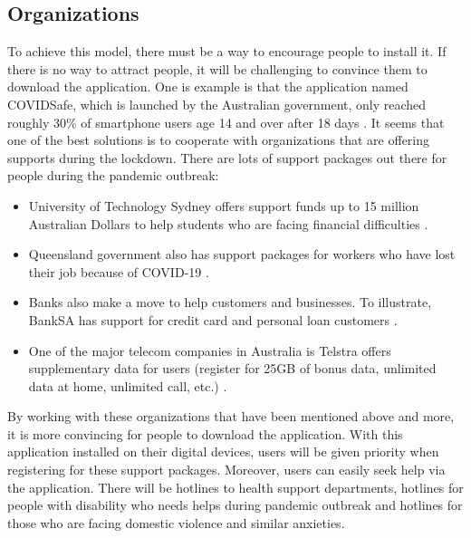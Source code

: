     \subsection{Organizations}
      \par To achieve this model, there must be a way to encourage people to install it. If there is no way to attract people, it will be challenging to convince them to download the application. One is example is that the application named COVIDSafe, which is launched by the Australian government, only reached roughly 30\% of smartphone users age 14 and over after 18 days \parencite{Stake13}. It seems that one of the best solutions is to cooperate with organizations that are offering supports during the lockdown. There are lots of support packages out there for people during the pandemic outbreak:
        \begin{itemize}
          \item University of Technology Sydney offers support funds up to 15 million Australian Dollars to help students who are facing financial difficulties \parencite{Stake14}.
          \item Queensland government also has support packages for workers who have lost their job because of COVID-19 \parencite{Stake15}.
          \item Banks also make a move to help customers and businesses. To illustrate, BankSA has support for credit card and personal loan customers \parencite{Stake16}.
          \item One of the major telecom companies in Australia is Telstra offers supplementary data for users (register for 25GB of bonus data, unlimited data at home, unlimited call, etc.) \parencite{Stake17}.
        \end{itemize}
      \par By working with these organizations that have been mentioned above and more, it is more convincing for people to download the application. With this application installed on their digital devices, users will be given priority when registering for these support packages. Moreover, users can easily seek help via the application. There will be hotlines to health support departments, hotlines for people with disability who needs helps during pandemic outbreak and hotlines for those who are facing domestic violence and similar anxieties.
